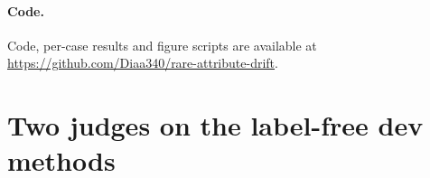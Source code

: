 \documentclass[10pt,twocolumn]{article}
\begin{document}
\paragraph{Code.} Code, per-case results and figure scripts are available at\\
\url{https://github.com/Diaa340/rare-attribute-drift}.

{\small


}

\appendix
\section{Two judges on the label-free dev methods}
\begin{table}[h]
\centering\small
\setlength{\tabcolsep}{3pt}
\resizebox{\linewidth}{!}{}
\caption{121 dev drift cases scored by both judges (\%).}
\end{table}
\end{document}
